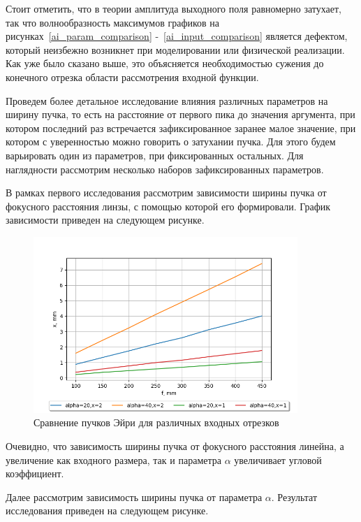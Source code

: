 {    Стоит отметить, что в теории амплитуда выходного поля
    равномерно затухает, так что волнообразность максимумов графиков на
    рисунках~\ref{ai_param_comparison} -~\ref{ai_input_comparison} является дефектом,
    который неизбежно возникнет при моделировании или физической реализации. Как уже было сказано выше, это
    объясняется необходимостью сужения до конечного отрезка области
    рассмотрения входной функции.

    Проведем более детальное исследование влияния различных параметров на ширину пучка, то есть на расстояние
    от первого пика до значения аргумента, при котором последний раз встречается зафиксированное заранее малое значение, при котором с уверенностью можно говорить о затухании пучка. Для этого будем варьировать один из параметров,
    при фиксированных остальных. Для наглядности рассмотрим несколько наборов зафиксированных параметров.

    В рамках первого исследования рассмотрим зависимости ширины пучка от фокусного расстояния линзы, с помощью которой
    его формировали. График зависимости приведен на следующем рисунке.

    \begin{figure}[H]
        \begin{center}
            \includegraphics[width=10cm]{plots/!graphics_focus}
            \caption{Сравнение пучков Эйри для различных входных отрезков}
            \label{graphics_focus}
        \end{center}
    \end{figure}

    Очевидно, что зависимость ширины пучка от фокусного расстояния линейна, а увеличение как входного размера, так и
    параметра $\alpha$ увеличивает угловой коэффициент.

    Далее рассмотрим зависимость ширины пучка от параметра $\alpha$. Результат исследования приведен на следующем рисунке.

}
